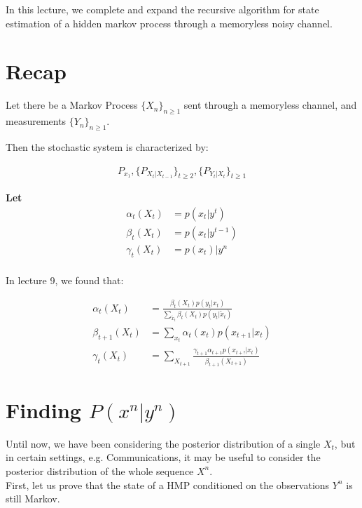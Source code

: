 \documentclass{article}
\begin{document}
	In this lecture, we complete and expand the recursive algorithm for state estimation of a hidden markov process through a memoryless noisy channel. 
	
	
	
	
	\section{Recap}
	
	Let there be a Markov Process $\{X_n\}_{n \geq 1}$ sent through a memoryless channel, and measurements $\{Y_n\}_{n \geq 1}$.
	
	Then the stochastic system is characterized by:
	
	\begin{align*}
		P_{x_1}, \{P_{X_t | X_{t-1}}\}_{t \geq 2}, \{P_{Y_t | X_t}\}_{t \geq 1}
	\end{align*}
	
	\textbf{Let}
	\begin{align*}
		\alpha_t(X_t) &= p(x_t | y^t)\\
		\beta_t(X_t) &= p(x_t | y^{t-1})\\
		\gamma_t(X_t) &= p(x_t) | y^n\\
	\end{align*}
	
	In lecture 9, we found that:
	
	\begin{align*}
		\alpha_t(X_t) &= \frac{\beta_t(X_t)p(y_t | x_t)}{\sum_{\tilde{x}_t}^{}\beta_t(X_t)p(y_t | \tilde{x}_t)}\\
		\beta_{t+1}(X_t) &= \sum_{x_t}^{}\alpha_t(x_t)p(x_{t+1} | x_t)\\
		\gamma_t(X_t) &= \sum_{X_{t+1}}^{}\frac{\gamma_{t+1}\alpha_{t+1}p(x_{t+!} | x_t)}{\beta_{t+1}(X_{t+1})}
	\end{align*}
	
	\section{Finding $ P(x^n | y^n) $}
	
	Until now, we have been considering the posterior distribution of a single $X_t$, but in certain settings, e.g. Communications, it may be useful to consider the posterior distribution of the whole sequence $X^n$.\\
	
	First, let us prove that the state of a HMP conditioned on the observations $Y^{n}$ is still Markov.\\
	
\end{document}
